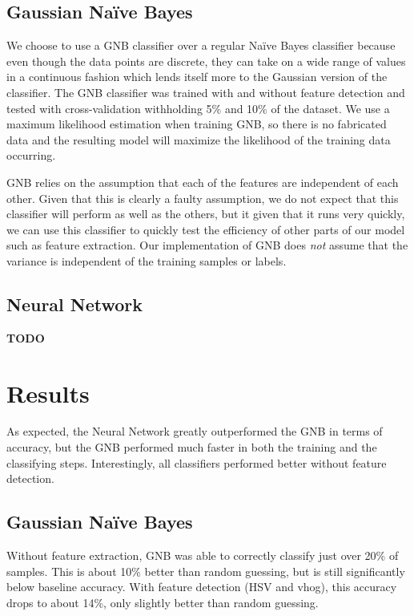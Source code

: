 \documentclass{article} %
\begin{document}
\subsection*{Gaussian Na\"ive Bayes}

We choose to use a GNB classifier over a regular Na\"ive Bayes classifier because even though the data points are discrete, they can take on a wide range of values in a continuous fashion which lends itself more to the Gaussian version of the classifier. The GNB classifier was trained with and without feature detection and tested with cross-validation withholding 5\% and 10\% of the dataset. We use a maximum likelihood estimation when training GNB, so there is no fabricated data and the resulting model will maximize the likelihood of the training data occurring.

GNB relies on the assumption that each of the features are independent of each other. Given that this is clearly a faulty assumption, we do not expect that this classifier will perform as well as the others, but it given that it runs very quickly, we can use this classifier to quickly test the efficiency of other parts of our model such as feature extraction. Our implementation of GNB does \textit{not} assume that the variance is independent of the training samples or labels.

\subsection*{Neural Network}

\textbf{TODO}

\section{Results}

As expected, the Neural Network greatly outperformed the GNB in terms of accuracy, but the GNB performed much faster in both the training and the classifying steps. Interestingly, all classifiers performed better without feature detection.

\subsection*{Gaussian Na\"ive Bayes}

Without feature extraction, GNB was able to correctly classify just over 20\% of samples. This is about 10\% better than random guessing, but is still significantly below baseline accuracy. With feature detection (HSV and vhog), this accuracy drops to about 14\%, only slightly better than random guessing.
\end{document}
